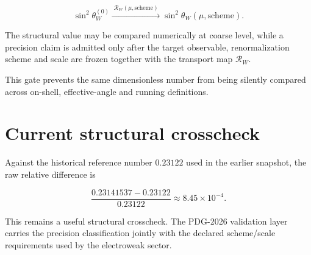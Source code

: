 \[
\boxed{
\sin^2\theta_W^{(0)}
\xrightarrow{\;\mathcal R_W(\mu,\text{scheme})\;}
\sin^2\theta_W(\mu,\text{scheme}).
}
\]

The structural value may be compared numerically at coarse level, while a
precision claim is admitted only after the target observable, renormalization
scheme and scale are frozen together with the transport map $\mathcal R_W$.

This gate prevents the same dimensionless number from being silently compared
across on-shell, effective-angle and running definitions.

\section{Current structural crosscheck}

Against the historical reference number $0.23122$ used in the earlier
snapshot, the raw relative difference is

\[
\frac{0.23141537-0.23122}{0.23122}\approx8.45\times10^{-4}.
\]

This remains a useful structural crosscheck.  The PDG-2026 validation layer
carries the precision classification jointly with the declared scheme/scale
requirements used by the electroweak sector.
